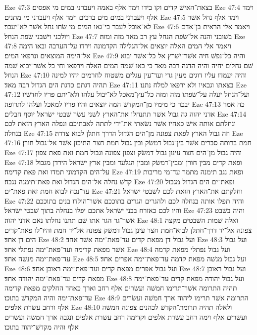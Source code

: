 Eze 47:3  בצאת־האישׁ קדים וקו בידו וימד אלף באמה ויעברני במים מי אפסים׃
Eze 47:4  וימד אלף ויעברני במים מים ברכים וימד אלף ויעברני מי מתנים׃
Eze 47:5  וימד אלף נחל אשׁר לא־אוכל לעבר כי־גאו המים מי שׂחו נחל אשׁר לא־יעבר׃
Eze 47:6  ויאמר אלי הראית בן־אדם ויולכני וישׁבני שׂפת הנחל׃
Eze 47:7  בשׁובני והנה אל־שׂפת הנחל עץ רב מאד מזה ומזה׃
Eze 47:8  ויאמר אלי המים האלה יוצאים אל־הגלילה הקדמונה וירדו על־הערבה ובאו הימה אל־הימה המוצאים ונרפאו המים׃
Eze 47:9  והיה כל־נפשׁ חיה אשׁר־ישׁרץ אל כל־אשׁר יבוא שׁם נחלים יחיה והיה הדגה רבה מאד כי באו שׁמה המים האלה וירפאו וחי כל אשׁר־יבוא שׁמה הנחל׃
Eze 47:10  והיה יעמדו עליו דוגים מעין גדי ועד־עין עגלים משׁטוח לחרמים יהיו למינה תהיה דגתם כדגת הים הגדול רבה מאד׃
Eze 47:11  בצאתו וגבאיו ולא ירפאו למלח נתנו׃
Eze 47:12  ועל־הנחל יעלה על־שׂפתו מזה ומזה כל־עץ־מאכל לא־יבול עלהו ולא־יתם פריו לחדשׁיו יבכר כי מימיו מן־המקדשׁ המה יוצאים והיו פריו למאכל ועלהו לתרופה׃
Eze 47:13  כה אמר אדני יהוה גה גבול אשׁר תתנחלו את־הארץ לשׁני עשׂר שׁבטי ישׂראל יוסף חבלים׃
Eze 47:14  ונחלתם אותה אישׁ כאחיו אשׁר נשׂאתי את־ידי לתתה לאבתיכם ונפלה הארץ הזאת לכם בנחלה׃
Eze 47:15  וזה גבול הארץ לפאת צפונה מן־הים הגדול הדרך חתלן לבוא צדדה׃
Eze 47:16  חמת ברותה סברים אשׁר בין־גבול דמשׂק ובין גבול חמת חצר התיכון אשׁר אל־גבול חורן׃
Eze 47:17  והיה גבול מן־הים חצר עינון גבול דמשׂק וצפון צפונה וגבול חמת ואת פאת צפון׃
Eze 47:18  ופאת קדים מבין חורן ומבין־דמשׂק ומבין הגלעד ומבין ארץ ישׂראל הירדן מגבול על־הים הקדמוני תמדו ואת פאת קדימה׃
Eze 47:19  ופאת נגב תימנה מתמר עד־מי מריבות קדשׁ נחלה אל־הים הגדול ואת פאת־תימנה נגבה׃
Eze 47:20  ופאת־ים הים הגדול מגבול עד־נכח לבוא חמת זאת פאת־ים׃
Eze 47:21  וחלקתם את־הארץ הזאת לכם לשׁבטי ישׂראל׃
Eze 47:22  והיה תפלו אותה בנחלה לכם ולהגרים הגרים בתוככם אשׁר־הולדו בנים בתוככם והיו לכם כאזרח בבני ישׂראל אתכם יפלו בנחלה בתוך שׁבטי ישׂראל׃
Eze 47:23  והיה בשׁבט אשׁר־גר הגר אתו שׁם תתנו נחלתו נאם אדני יהוה׃
Eze 48:1  ואלה שׁמות השׁבטים מקצה צפונה אל־יד דרך־חתלן לבוא־חמת חצר עינן גבול דמשׂק צפונה אל־יד חמת והיו־לו פאת־קדים הים דן אחד׃
Eze 48:2  ועל גבול דן מפאת קדים עד־פאת־ימה אשׁר אחד׃
Eze 48:3  ועל גבול אשׁר מפאת קדימה ועד־פאת־ימה נפתלי אחד׃
Eze 48:4  ועל גבול נפתלי מפאת קדמה עד־פאת־ימה מנשׁה אחד׃
Eze 48:5  ועל גבול מנשׁה מפאת קדמה עד־פאת־ימה אפרים אחד׃
Eze 48:6  ועל גבול אפרים מפאת קדים ועד־פאת־ימה ראובן אחד׃
Eze 48:7  ועל גבול ראובן מפאת קדים עד־פאת־ימה יהודה אחד׃
Eze 48:8  ועל גבול יהודה מפאת קדים עד־פאת־ימה תהיה התרומה אשׁר־תרימו חמשׁה ועשׂרים אלף רחב וארך כאחד החלקים מפאת קדימה עד־פאת־ימה והיה המקדשׁ בתוכו׃
Eze 48:9  התרומה אשׁר תרימו ליהוה ארך חמשׁה ועשׂרים אלף ורחב עשׂרת אלפים׃
Eze 48:10  ולאלה תהיה תרומת־הקדשׁ לכהנים צפונה חמשׁה ועשׂרים אלף וימה רחב עשׂרת אלפים וקדימה רחב עשׂרת אלפים ונגבה ארך חמשׁה ועשׂרים אלף והיה מקדשׁ־יהוה בתוכו׃
